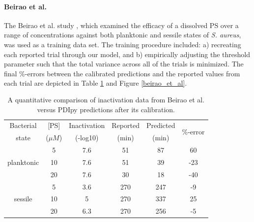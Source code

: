 \paragraph{Beirao et al.}
The Beirao et al. study \cite{Beirao2014PhotodynamicPorphyrin}, which examined the efficacy of a dissolved PS over a range of concentrations against both planktonic and sessile states of \textit{S. aureus}, was used as a training data set. The training procedure included: a) recreating each reported trial through our model, and b) empirically adjusting the threshold parameter such that the total variance across all of the trials is minimized. The final \%-errors between the calibrated predictions and the reported values from each trial are depicted in Table \ref{beirao_et_al_data} and Figure \ref{beirao_et_al}. 

\begin{table}
    \centering
    \begin{tabular}{c|c|c|c|c|c}
        Bacterial & [PS] & Inactivation & Reported & Predicted & \multirow{2}{1.2cm}{\%-error}\\
        state & ($\mu M$) & (-log10) & (min) & (min) & \\
        \toprule
        \multirow{3}{2cm}{planktonic} & 5 & 7.6 & 51 & 87 & 60\\
        & 10 & 7.6 & 51 & 39 & -23\\
        & 20 & 7.6 & 30 & 18 & -40\\
        \midrule
        \multirow{3}{2cm}{sessile} & 5 & 3.6 & 270 & 247 & -9\\
        & 10 & 5 & 270 & 337 & 25\\
        & 20 & 6.3 & 270 & 256 & -5\\
        \bottomrule
    \end{tabular}
    \caption{
        A quantitative comparison of inactivation data from Beirao et al. versus PDIpy predictions after its calibration. 
    }
    \label{beirao_et_al_data}
\end{table}

